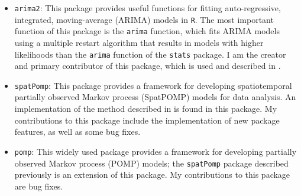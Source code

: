\documentclass{article}
\begin{document}
\begin{itemize}
    \item \texttt{arima2}: This package provides useful functions for fitting auto-regressive, integrated, moving-average (ARIMA) models in \texttt{R}. The most important function of this package is the \texttt{arima} function, which fits ARIMA models using a multiple restart algorithm that results in models with higher likelihoods than the \texttt{arima} function of the \texttt{stats} package.
    I am the creator and primary contributor of this package, which is used and described in \cite{wheeler2023-a}.
    \item \texttt{spatPomp}: This package provides a framework for developing spatiotemporal partially observed Markov process (SpatPOMP) models for data analysis. An implementation of the method described in \cite{ionides22} is found in this package.
    My contributions to this package include the implementation of new package features, as well as some bug fixes.

    \item \texttt{pomp}: This widely used package provides a framework for developing partially observed Markov process (POMP) models; the \texttt{spatPomp} package described previously is an extension of this package.
    My contributions to this package are bug fixes.
\end{itemize}



\end{document}
